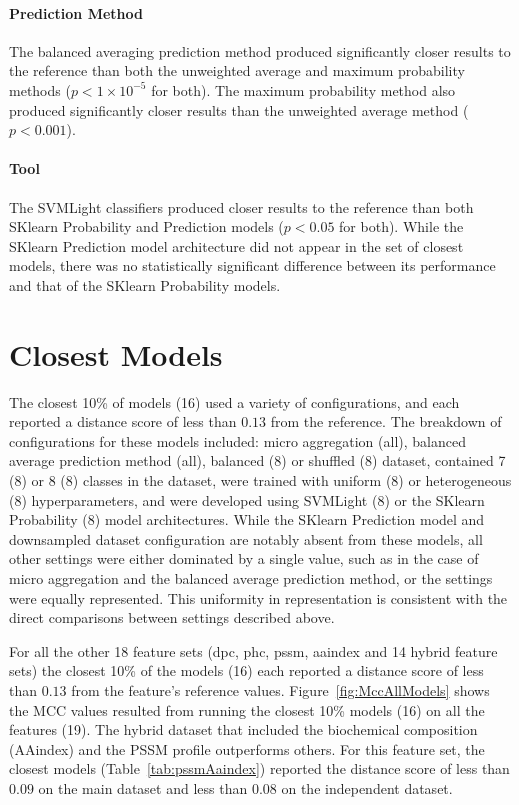 \paragraph{Prediction Method}
The balanced averaging prediction method produced significantly closer results to the reference than both the
unweighted average and maximum probability methods ($p < 1\times 10^{-5}$ for both). The maximum probability method
also produced significantly closer results than the unweighted average method ($p < 0.001$).

\paragraph{Tool}
The SVMLight classifiers produced closer results to the reference than both SKlearn Probability and Prediction models
($p < 0.05$ for both). While the SKlearn Prediction model architecture did not appear in the set of closest models,
there was no statistically significant difference between its performance and that of the SKlearn Probability models.

\section{Closest Models}
The closest 10\% of models (16) used a variety of configurations, and each reported a distance score of less than
$0.13$ from the reference. The breakdown of configurations for these models included: micro aggregation (all), balanced
average prediction method (all), balanced (8) or shuffled (8) dataset, contained 7 (8) or 8 (8) classes in the dataset,
were trained with uniform (8) or heterogeneous (8) hyperparameters, and were developed using SVMLight (8) or the
SKlearn Probability (8) model architectures. While the SKlearn Prediction model and downsampled dataset configuration
are notably absent from these models, all other settings were either dominated by a single value, such as in the case
of micro aggregation and the balanced average prediction method, or the settings were equally represented. This
uniformity in representation is consistent with the direct comparisons between settings described above.

For all the other 18 feature sets (dpc, phc, pssm, aaindex and 14 hybrid feature sets) the closest 10\% of the models (16) 
each reported a distance score of less than $0.13$ from the feature's reference values. 
Figure~\ref{fig:MccAllModels} shows the MCC values resulted from running 
the closest 10\% models (16) on all the features (19). 
The hybrid dataset that included the biochemical composition (AAindex) and the PSSM profile 
outperforms others. For this feature set, the closest models (Table~\ref{tab:pssmAaindex}) reported 
the distance score of less than $0.09$ on the main dataset and less than $0.08$ on the independent dataset.

